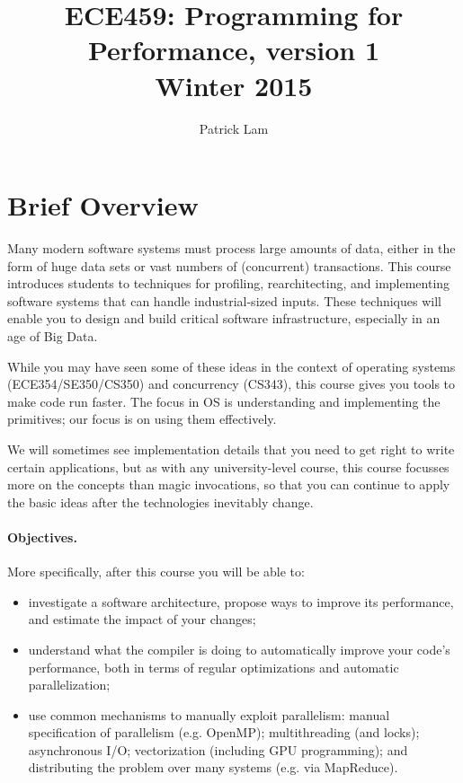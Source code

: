 \documentclass{article}
\begin{document}
\title{ECE459: Programming for Performance, version 1\\Winter 2015}
\author{Patrick Lam}
\renewcommand{\today}{}
\maketitle
\vspace*{-2em}

\section*{Brief Overview}

Many modern software systems must process large amounts of data, either in the
form of huge data sets or vast numbers of (concurrent) transactions.  This
course introduces students to techniques for profiling, rearchitecting, and
implementing software systems that can handle industrial-sized
inputs. These techniques will enable you to design and build
critical software infrastructure, especially in an age of Big Data.

While you may have seen some of these ideas in the context of
operating systems (ECE354/SE350/CS350) and concurrency (CS343), this course gives you tools to make code run
faster. The focus in OS is understanding and implementing the
primitives; our focus is on using them effectively. 

We will sometimes see implementation details that you need to get right to write
certain applications, but as with any university-level course, this course
focusses more on the concepts than magic invocations, so that you can continue
to apply the basic ideas after the technologies inevitably change.


\paragraph{Objectives.} More specifically, after this course you will be able to:
\begin{itemize}
\item investigate a software architecture, propose ways to improve its performance, and estimate the impact of your changes; 
\item understand what the compiler is doing to automatically improve
  your code's performance, both in terms of regular optimizations and
  automatic parallelization;
\item use common mechanisms to manually exploit parallelism: manual
  specification of parallelism (e.g. OpenMP); multithreading (and
  locks); asynchronous I/O; vectorization (including GPU programming); and distributing
  the problem over many systems (e.g. via MapReduce).
\end{itemize}
\end{document}
